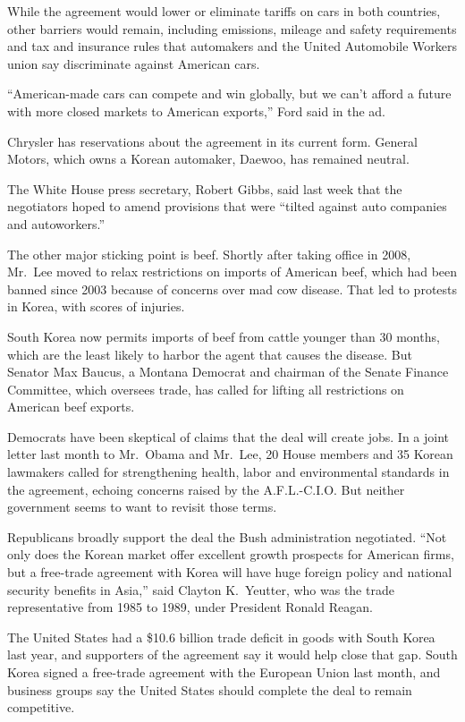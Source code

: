 ﻿\documentclass[12pt]{article}
\begin{document}
While the agreement would lower or eliminate tariffs on cars in both countries, other barriers would
remain, including emissions, mileage and safety requirements and tax and insurance rules that
automakers and the United Automobile Workers union say discriminate against American cars.

``American-made cars can compete and win globally, but we can't afford a future with more closed
markets to American exports,'' Ford said in the ad.

Chrysler has reservations about the agreement in its current form. General Motors, which owns a
Korean automaker, Daewoo, has remained neutral.

The White House press secretary, Robert Gibbs, said last week that the negotiators hoped to amend
provisions that were ``tilted against auto companies and autoworkers.''

The other major sticking point is beef. Shortly after taking office in 2008, Mr.~Lee moved to relax
restrictions on imports of American beef, which had been banned since 2003 because of concerns over
mad cow disease. That led to protests in Korea, with scores of injuries.

South Korea now permits imports of beef from cattle younger than 30 months, which are the least
likely to harbor the agent that causes the disease. But Senator Max Baucus, a Montana Democrat and
chairman of the Senate Finance Committee, which oversees trade, has called for lifting all
restrictions on American beef exports.

Democrats have been skeptical of claims that the deal will create jobs. In a joint letter last month
to Mr.~Obama and Mr.~Lee, 20 House members and 35 Korean lawmakers called for strengthening health,
labor and environmental standards in the agreement, echoing concerns raised by the A.F.L.-C.I.O. But
neither government seems to want to revisit those terms.

Republicans broadly support the deal the Bush administration negotiated. ``Not only does the Korean
market offer excellent growth prospects for American firms, but a free-trade agreement with Korea
will have huge foreign policy and national security benefits in Asia,'' said Clayton K.~Yeutter, who
was the trade representative from 1985 to 1989, under President Ronald Reagan.

The United States had a \$10.6 billion trade deficit in goods with South Korea last year, and
supporters of the agreement say it would help close that gap. South Korea signed a free-trade
agreement with the European Union last month, and business groups say the United States should
complete the deal to remain competitive.
\end{document}
